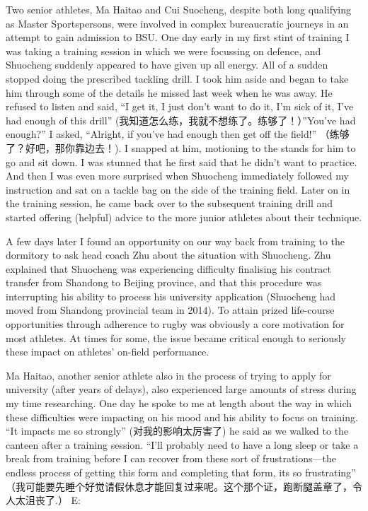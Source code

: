 \begin{CJK}{UTF8}{gbsn}
Two senior athletes, Ma Haitao and Cui Suocheng, despite both long qualifying as Master Sportspersons, were involved in complex bureaucratic journeys in an attempt to gain admission to BSU.  One day early in my first stint of training I was taking a training session in which we were focussing on defence, and Shuocheng suddenly appeared to have given up all energy.  All of a sudden stopped doing the prescribed tackling drill.  I took him aside and began to take him through some of the details he missed last week when he was away.  He refused to listen and said, ``I get it, I just don’t want to do it, I’m sick of it, I’ve had enough of this drill'' (我知道怎么练，我就不想练了。练够了！）''You’ve had enough?'' I asked, ``Alright, if you’ve had enough then get off the field!'' （练够了？好吧，那你靠边去！).  I snapped at him, motioning to the stands for him to go and sit down. I was stunned that he first said that he didn’t want to practice. And then I was even more surprised when Shuocheng immediately followed my instruction and sat on a tackle bag on the side of the training field.  Later on in the training session, he came back over to the subsequent training drill and started offering (helpful) advice to the more junior athletes about their technique.

A few days later I found an opportunity on our way back from training to the dormitory to ask head coach Zhu about the situation with Shuocheng.  Zhu explained that Shuocheng was experiencing difficulty finalising his contract transfer from Shandong to Beijing province, and that this procedure was interrupting his ability to process his university application (Shuocheng had moved from Shandong provincial team in 2014). To attain prized life-course opportunities through adherence to rugby was obviously a core motivation for most athletes. At times for some, the issue became critical enough to seriously these impact on athletes' on-field performance.

Ma Haitao, another senior athlete also in the process of trying to apply for university (after years of delays), also experienced large amounts of stress during my time researching.  One day he spoke to me at length about the way in which these difficulties were impacting on his mood and his ability to focus on training. ``It impacts me so strongly'' (对我的影响太厉害了) he said as we walked to the canteen after a training session. ``I’ll probably need to have a long sleep or take a break from training before I can recover from these sort of frustrations---the endless process of getting this form and completing that form, its so frustrating'' （我可能要先睡个好觉请假休息才能回复过来呢。这个那个证，跑断腿盖章了，令人太沮丧了.）
E:



\end{CJK}
